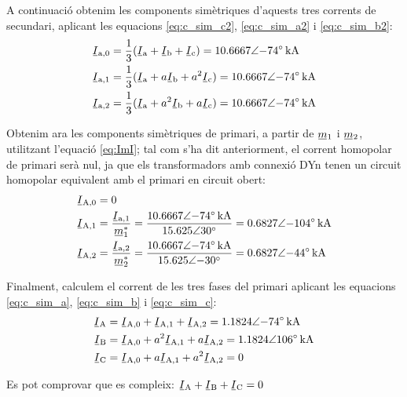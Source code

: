 \begin{exemple}[\CCasimSecTrafo{}]
    A continuació obtenim les components simètriques d'aquests tres corrents de secundari, aplicant les equacions \eqref{eq:c_sim_c2}, \eqref{eq:c_sim_a2} i \eqref{eq:c_sim_b2}:
    \begin{align*}
        \cmplx{I}\ped{a,0} &= \frac{1}{3} (\cmplx{I}\ped{a} + \cmplx{I}\ped{b} +
        \cmplx{I}\ped{c}) = \complexqty{10,6667:-74}{kA} \\
        \cmplx{I}\ped{a,1} &= \frac{1}{3} (\cmplx{I}\ped{a} + a \cmplx{I}\ped{b} +
         a^2 \cmplx{I}\ped{c}) = \complexqty{10,6667:-74}{kA}  \\
        \cmplx{I}\ped{a,2} &= \frac{1}{3} (\cmplx{I}\ped{a} + a^2 \cmplx{I}\ped{b} +
         a \cmplx{I}\ped{c}) = \complexqty{10,6667:-74}{kA}
    \end{align*}

    Obtenim ara les components simètriques de primari, a partir de $\cmplx{m}_1$ i $\cmplx{m}_2$, utilitzant l'equació \eqref{eq:ImI}; tal com s'ha dit anteriorment, el corrent homopolar de primari serà nul, ja que els transformadors amb connexió DYn tenen un circuit homopolar equivalent amb el primari en circuit obert:
    \begin{align*}
        \cmplx{I}\ped{A,0} &= 0 \\
        \cmplx{I}\ped{A,1} &= \frac{\cmplx{I}\ped{a,1}}{\cmplx{m}^*_1} = \frac{\complexqty{10,6667:-74}{kA}}{\complexnum{15,625:30}} =  \complexqty{0,6827:-104}{kA} \\
        \cmplx{I}\ped{A,2} &= \frac{\cmplx{I}\ped{a,2}}{\cmplx{m}^*_2} = \frac{\complexqty{10,6667:-74}{kA}}{\complexnum{15,625:-30}} = \complexqty{0,6827:-44}{kA}
    \end{align*}

    Finalment, calculem el corrent de les tres fases del primari aplicant les equacions \eqref{eq:c_sim_a}, \eqref{eq:c_sim_b} i \eqref{eq:c_sim_c}:
     \begin{align*}
        \cmplx{I}\ped{A} &= \cmplx{I}\ped{A,0} + \cmplx{I}\ped{A,1} + \cmplx{I}\ped{A,2} = \complexqty{1,1824:-74}{kA} \\
        \cmplx{I}\ped{B} &= \cmplx{I}\ped{A,0} + a^2 \cmplx{I}\ped{A,1} + a \cmplx{I}\ped{A,2} = \complexqty{1,1824:106}{kA} \\
        \cmplx{I}\ped{C} &= \cmplx{I}\ped{A,0} + a \cmplx{I}\ped{A,1} + a^2 \cmplx{I}\ped{A,2} = 0
    \end{align*}

    Es pot comprovar que es compleix: $\cmplx{I}\ped{A} + \cmplx{I}\ped{B} + \cmplx{I}\ped{C} = 0$


\end{exemple}

